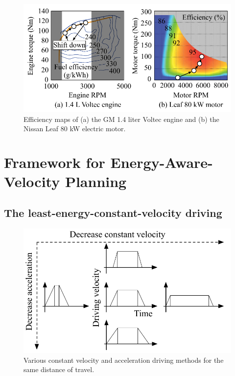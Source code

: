 \documentclass{IEEEtran}
\begin{document}
\begin{figure}	%
\includegraphics[width=1.0\hsize]{Figures/efficiency_maps.pdf}
\caption{Efficiency maps of (a) the GM 1.4 liter Voltec engine and (b) the Nissan Leaf 80 kW electric motor.}
\label{fig:efficiency_map}
\end{figure} 

\section{Framework for Energy-Aware-Velocity Planning} \label{sec:framework}

\subsection{The least-energy-constant-velocity driving} \label{subsec:constant drive}

\begin{figure} %
\centering
\includegraphics[width=0.85\hsize]{Figures/const_vel_drive_problem.pdf}
\caption{Various constant velocity and acceleration driving methods for the same distance of travel.}
\label{fig:const_vel_drive_problem}
\end{figure} 
\end{document}
